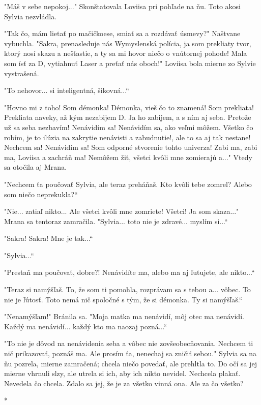 \documentclass{book}
\begin{document}
"$ $Máš v sebe nepokoj..."$ $ Skonštatovala Loviisa pri pohľade na ňu. Toto akosi Sylvia nezvládla.

"$ $Tak čo, mám lietať po mačičkoese, smiať sa a rozdávať úsmevy?"$ $ Naštvane vybuchla. "$ $Sakra, prenasleduje nás Wymyslenská polícia, ja som prekliaty tvor, ktorý nosí skazu a nešťastie, a ty sa mi hovor niečo o vnútornej pohode! Mala som ísť za D, vytiahnuť Laser a preťať nás oboch!"$ $ Loviisa bola mierne zo Sylvie vystrašená.

"$ $To nehovor... si inteligentná, šikovná...“

"$ $Hovno mi z toho! Som démonka! Démonka, vieš čo to znamená! Som prekliata! Prekliata naveky, až kým nezabijem D. Ja ho zabijem, a s ním aj seba. Pretože už sa seba nezbavím! Nenávidím sa! Nenávidím sa, ako veľmi môžem. Všetko čo robím, je to ilúzia na zakrytie nenávisti a zabudnutie!, ale to sa aj tak nestane! Nechcem sa! Nenávidím sa! Som odporné stvorenie tohto univerza! Zabi ma, zabi ma, Loviisa a zachráň ma! Nemôžem žiť, všetci kvôli mne zomierajú a..."$ $ Vtedy sa otočila aj Mrana.

"$ $Nechcem ťa poučovať Sylvia, ale teraz preháňaš. Kto kvôli tebe zomrel? Alebo som niečo neprekukla?“

"$ $Nie... zatiaľ nikto... Ale všetci kvôli mne zomriete! Všetci! Ja som skaza..."$ $ Mrana sa tentoraz zamračila. "$ $Sylvia... toto nie je zdravé... myslím si...“

"$ $Sakra! Sakra! Mne je tak...“

"$ $Sylvia...“

"$ $Prestaň ma poučovať, dobre?! Nenávidíte ma, alebo ma aj ľutujete, ale nikto...“

"$ $Teraz si namýšľaš. To, že som ti pomohla, rozprávam sa s tebou a... vôbec. To nie je ľútosť. Toto nemá nič spoločné s tým, že si démonka. Ty si namýšľaš.“

"$ $Nenamýšľam!"$ $ Bránila sa. "$ $Moja matka ma nenávidí, môj otec ma nenávidí. Každý ma nenávidí... každý kto ma naozaj pozná...“

"$ $To nie je dôvod na nenávidenia seba a vôbec nie zovšeobecňovania. Nechcem ti nič prikazovať, poznáš ma. Ale prosím ťa, nenechaj sa zničiť sebou."$ $ Sylvia sa na ňu pozrela, mierne zamračená; chcela niečo povedať, ale prehltla to. Do očí sa jej mierne vhrnuli slzy, ale utrela si ich, aby ich nikto nevidel. Nechcela plakať. Nevedela čo chcela. Zdalo sa jej, že je za všetko vinná ona. Ale za čo všetko?

\begin{center}

*

\end{center}
\end{document}
